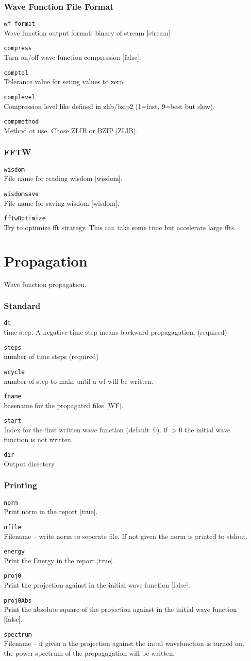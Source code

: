 \documentclass[a4paper,12pt]{scrbook}
\newcommand{\option}[2]{\item \texttt{#1}\\ #2}
\begin{document}
\subsubsection{Wave Function File Format}
\begin{options}
 \option{wf\_format}{Wave function output format: binary of stream  [stream]}
 \option{compress}{Turn on/off wave function compression [false].}
 \option{comptol}{Tolerance value for seting values to zero.}
 \option{complevel}{Compression level like defined in zlib/bzip2 (1=fast, 9=best but slow).}
 \option{compmethod}{Method ot use. Chose ZLIB or BZIP [ZLIB].}
\end{options}

\subsubsection{FFTW}
\begin{options}
 \option{wisdom}{File name for reading wisdom [wisdom].}
 \option{wisdomsave}{File name for saving wisdom [wisdom].}
 \option{fftwOptimize}{Try to optimize fft strategy. This can take some time but accelerate large ffts.}
\end{options}


\section{Propagation}
Wave function propagation.
\subsubsection*{Standard}
\begin{options}
\option{dt}{time step. A negative time step means backward propagagation. (required)}
\option{steps}{number of time steps (required)}
\option{wcycle}{number of step to make until a wf will be written.}
\option{fname}{basename for the propagated files [WF].}
\option{start}{Index for the first written wave function (default: 0). if $>0$ the initial wave function is not written.}
\option{dir}{Output directory.}
\end{options}

\subsubsection*{Printing}
\begin{options}
\option{norm}{Print norm in the report [true].}
\option{nfile}{Filename -- write norm to seperate file. If not given the norm is printed to stdout.}
\option{energy}{Print the Energy in the report [true].}
\option{proj0}{Print the projection against in the initial wave function [false].}
\option{proj0Abs}{Print the absolute square of the projection against in the initial wave function [false].}
\option{spectrum}{Filename -- if given a the projection against the inital wavefunction is turned on, the power spectrum of the propagagation will be written.}
\end{options}
\end{document}
